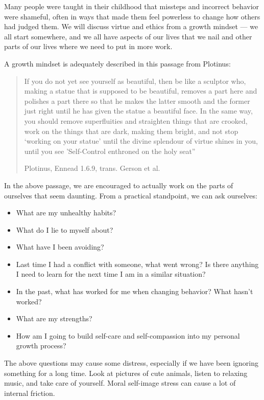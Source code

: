 \documentclass[
]{book}
\providecommand{\tightlist}{%
  \setlength{\itemsep}{0pt}\setlength{\parskip}{0pt}}
\begin{document}
Many people were taught in their childhood that missteps and incorrect behavior were shameful, often in ways that made them feel powerless to change how others had judged them. We will discuss virtue and ethics from a growth mindset --- we all start somewhere, and we all have aspects of our lives that we nail and other parts of our lives where we need to put in more work.

A growth mindset is adequately described in this passage from Plotinus:

\begin{quote}
If you do not yet see yourself as beautiful, then be like a sculptor who, making a statue that is supposed to be beautiful, removes a part here and polishes a part there so that he makes the latter smooth and the former just right until he has given the statue a beautiful face. In the same way, you should remove superfluities and straighten things that are crooked, work on the things that are dark, making them bright, and not stop `working on your statue' until the divine splendour of virtue shines in you, until you see 'Self-Control enthroned on the holy seat''

Plotinus, Ennead 1.6.9, trans. Gerson et al.
\end{quote}

In the above passage, we are encouraged to actually work on the parts of ourselves that seem daunting. From a practical standpoint, we can ask ourselves:

\begin{itemize}
\tightlist
\item
  What are my unhealthy habits?
\item
  What do I lie to myself about?
\item
  What have I been avoiding?
\item
  Last time I had a conflict with someone, what went wrong? Is there anything I need to learn for the next time I am in a similar situation?
\item
  In the past, what has worked for me when changing behavior? What hasn't worked?
\item
  What are my strengths?
\item
  How am I going to build self-care and self-compassion into my personal growth process?
\end{itemize}

The above questions may cause some distress, especially if we have been ignoring something for a long time. Look at pictures of cute animals, listen to relaxing music, and take care of yourself. Moral self-image stress can cause a lot of internal friction.
\end{document}
